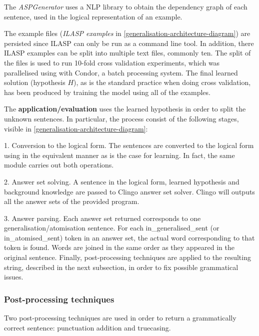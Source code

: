 The \textit{ASPGenerator} uses a NLP library to obtain the dependency graph of each sentence, used in the logical representation of an example.

The example files (\textit{ILASP examples} in \ref{generalisation-architecture-diagram}) are persisted since ILASP can only be run as a command line tool.
In addition, there ILASP examples can be split into multiple text files, commonly ten. 
The split of the files is used to run 10-fold cross validation experiments, which was parallelised using with Condor, a batch processing system.
The final learned solution (hypothesis $H$), as is the standard practice when doing cross validation, has been produced by training the model using all of the examples.

The \textbf{application/evaluation} uses the learned hypothesis in order to split the unknown sentences.
In particular, the process consist of the following stages, visible in \ref{generalisation-architecture-diagram}:
 
 1. Conversion to the logical form. The sentences are converted to the logical form using in the equivalent manner as is the case for learning. In fact, the same module carries out both operations.
 
 2. Answer set solving. A sentence in the logical form, learned hypothesis and background knowledge are passed to Clingo answer set solver. Clingo will outputs all the answer sets of the provided program.
 
 3. Answer parsing. Each answer set returned corresponds to one generalisation/atomisation sentence. For each in\_generalised\_sent (or in\_atomised\_sent) token in an answer set, the actual word corresponding to that token is found. Words are joined in the same order as they appeared in the original sentence. Finally, post-processing techniques are applied to the resulting string, described in the next subsection, in order to fix possible grammatical issues. 
 
 
\subsubsection{Post-processing techniques}

Two post-processing techniques are used in order to return a grammatically correct sentence: punctuation addition and truecasing.

